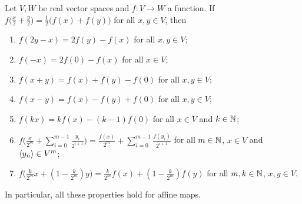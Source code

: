 \begin{lemma} \label{midpointPreservingMapLemma}
Let $V,W$ be real vector spaces and $f: V\to W$ a function. If $f\Big(\frac{x}{2} + \frac{y}{2}\Big) = \frac{1}{2}\big(f(x)+f(y)\big)$ for all $x,y\in V$, then
\begin{enumerate}
\item $f(2y-x) = 2f(y)-f(x)$ for all $x,y\in V$;
\item $f(-x) = 2f(0)-f(x)$ for all $x\in V$;
\item $f(x+y) = f(x)+f(y)-f(0)$ for all $x,y\in V$;
\item $f(x-y) = f(x)-f(y)+f(0)$ for all $x,y\in V$;
\item $f(kx) = kf(x) - (k-1)f(0)$ for all $x\in V$ and $k\in \mathbb{N}$;
\item $f\Big(\frac{x}{2^m} + \sum_{i=0}^{m-1} \frac{y_i}{2^{i+1}}\Big) = \frac{f(x)}{2^m} + \sum_{i=0}^{m-1} \frac{f(y_i)}{2^{i+1}}$ for all $m\in \mathbb{N}$, $x\in V$ and $\left\langle y_n \right\rangle\in V^m$;
\item $f\Big(\frac{k}{2^m}x + (1- \frac{k}{2^m})y\Big) = \frac{k}{2^m}f(x) + (1- \frac{k}{2^m})f(y)$ for all $m,k\in\mathbb{N}$, $x,y\in V$.
\end{enumerate}
\end{lemma}
In particular, all these properties hold for affine maps.
